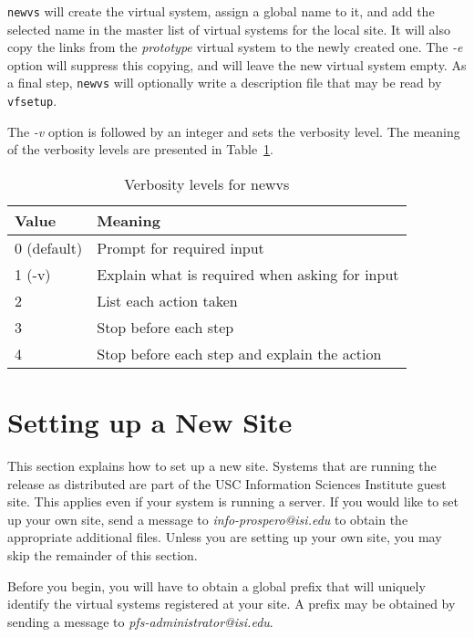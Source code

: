 {\tt newvs} will create the virtual system, assign a global name to
it, and add the selected name in the master list of virtual systems
for the local site.  It will also copy the links from the {\it
prototype} virtual system to the newly created one.  The {\em -e}
option will suppress this copying, and will leave the new virtual
system empty.  As a final step, {\tt newvs} will optionally write a
description file that may be read by {\tt vfsetup}.

The {\em -v} option is followed by an integer and sets the verbosity
level.  The meaning of the verbosity levels are presented in
Table~\ref{newvs_verbosity_tab}.

\begin{table}
\begin{center}
\caption{Verbosity levels for newvs\label{newvs_verbosity_tab}}
\vspace{0.1in}
\begin{tabular}{|l|l|}\hline
Value & Meaning \\ \hline \hline
0 (default) & Prompt for required input \\ \hline
1 (-v) & Explain what is required when asking for input \\ \hline
2 & List each action taken \\ \hline
3 & Stop before each step \\ \hline
4 & Stop before each step and explain the action \\ \hline
\end{tabular}
\vspace{-0.1in}
\end{center}
\end{table}

\section{Setting up a New Site\label{new_site}}

This section explains how to set up a new site.  Systems that are
running the release as distributed are part of the USC Information
Sciences Institute guest site.  This applies even if your system is running a
server.  If you would like to set up your own site, send a message to
{\it info-prospero@isi.edu} to obtain the appropriate
additional files.  Unless you are setting up
your own site, you may skip the remainder of this section.

Before you begin, you will have to obtain a global prefix that will
uniquely identify the virtual systems registered at your site.  A
prefix may be obtained by sending a message to {\it
pfs-administrator@isi.edu}.

